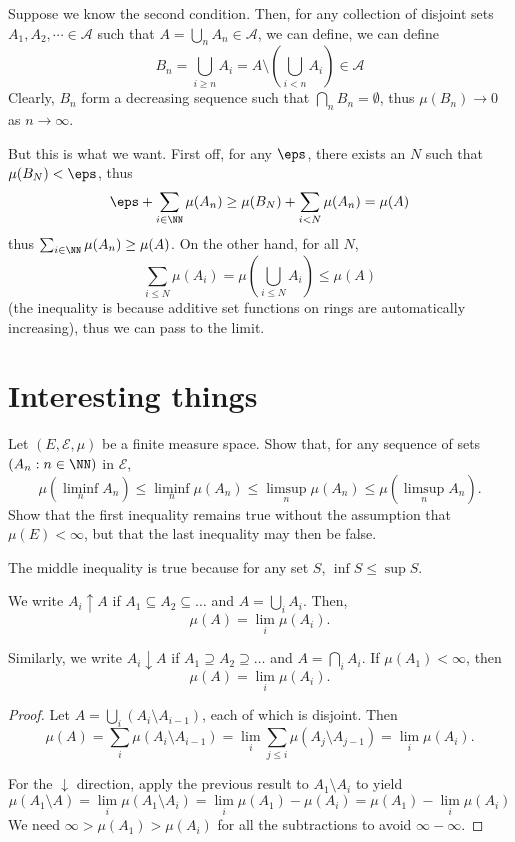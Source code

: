 \documentclass[11pt, headheight=30pt]{scrartcl}
\begin{document}
\begin{psec*}
    Suppose we know the second condition. Then, for any collection
    of disjoint sets $A_1, A_2, \cdots \in \mathcal{A}$ such
    that $A = \bigcup_n A_n \in \mathcal{A}$, we can define, we can define
    \[
        B_n = \bigcup_{i\geq n} A_i = A\setminus\left( \bigcup_{i < n} A_i \right) \in \mathcal{A}
    \]
    Clearly, $B_n$ form a decreasing sequence such that
    $\bigcap_n B_n = \emptyset$, thus $\mu(B_n) \to 0$ as $n\to \infty$.

    But this is what we want. First off, for any $\eps$, there exists an $N$
    such that $\mu(B_N) < \eps$, thus
    \[
        \eps + \sum_{i\in \NN} \mu(A_n) \geq \mu(B_N) + \sum_{i< N} \mu(A_n) = \mu(A)
    \]
    thus $\sum_{i\in \NN} \mu(A_n) \geq \mu(A)$. On the other hand,
    for all $N$,
    \[
        \sum_{i\leq N} \mu(A_i) = \mu\left(\bigcup_{i\leq N} A_i\right) \leq \mu(A)    
    \]
    (the inequality is because additive set functions
    on rings are automatically increasing), thus we can pass to the limit.
\end{psec*}

\section{Interesting things}

\begin{prob}
    Let $(E, \mathcal{E}, \mu)$ be a finite measure space. Show that, for
    any sequence of sets $(A_n : n \in \NN)$ in $\mathcal{E}$,
    \[
        \mu\left(\liminf_n A_n\right) \leq \liminf_n \mu(A_n) \leq
        \limsup_n \mu(A_n) \leq \mu\left(\limsup_n A_n\right).
    \]
    Show that the first inequality remains true without the
    assumption that $\mu(E) < \infty$, but that the last
    inequality may then be false.
\end{prob}
The middle inequality is true because for any set $S$,
$\inf S \leq \sup S$.

\begin{claim*}
    We write $A_i \uparrow A$ if $A_1 \subseteq A_2 \subseteq \dots$
    and $A = \bigcup_i A_i$. Then,
    \[
        \mu(A) = \lim_i \mu(A_i).
    \]

    Similarly, we write $A_i \downarrow A$ if $A_1 \supseteq A_2 \supseteq \dots$
    and $A = \bigcap_i A_i$. If $\mu(A_1) < \infty$, then
    \[
        \mu(A) = \lim_i \mu(A_i).
    \]
\end{claim*}
\begin{proof}
    Let $A = \bigcup_i (A_i \setminus A_{i-1})$, each of which is disjoint.
    Then
    \[
        \mu(A) = \sum_i \mu(A_i \setminus A_{i-1})
        = \lim_i \sum_{j\leq i} \mu(A_j \setminus A_{j-1}) = \lim_i \mu(A_i).    
    \]

    For the $\downarrow$ direction, apply the previous
    result to $A_1 \setminus A_i$ to yield
    \[
        \mu(A_1\setminus A) = \lim_i \mu(A_1 \setminus A_i)
        = \lim_i \mu(A_1) - \mu(A_i) = \mu(A_1) - \lim_i \mu(A_i)
    \]
    We need $\infty > \mu(A_1) > \mu(A_i)$ for all the subtractions
    to avoid $\infty - \infty$.
\end{proof}
\end{document}
